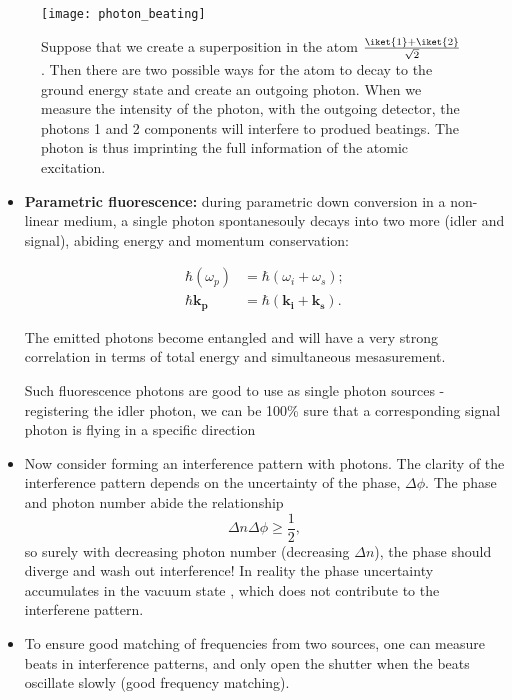 \begin{figure}[h]
  \centering%
  \texttt{[image: photon\_beating]}
  \caption{\small Suppose  that we create  a superposition in  the atom
    $ \frac{\iket{1}+\iket{2}}{\sqrt{2}} $. Then there are two possible
    ways for the atom to decay to the ground energy state and create an
    outgoing photon.  When we measure the intensity of the photon, with
    the  outgoing detector,  the photons  1 and  2 components
    will interfere to  produed beatings. The photon  is thus imprinting
    the  full information  of the  atomic excitation.   }
\end{figure}

\noindent

\begin{itemize}
\item   \textbf{Parametric   fluorescence:}  during   parametric   down
  conversion  in a  non-linear  medium, a  single photon  spontanesouly
  decays into two more (idler  and signal), abiding energy and momentum
  conservation:

  \begin{equation}
    \begin{aligned}
      \hbar(\omega_p) & = \hbar(\omega_i + \omega_s);\\
      \hbar\mathbf{k_p} & = \hbar(\mathbf{k_i} + \mathbf{k_s}).
    \end{aligned}
  \end{equation}

  \noindent The emitted  photons become entangled and will  have a very
  strong  correlation  in  terms   of  total  energy  and  simultaneous
  mesasurement.

  Such fluorescence photons are good to  use as single photon sources -
  registering  the  idler   photon,  we  can  be  100\%   sure  that  a
  corresponding signal photon is flying in a specific direction
\item Now  consider forming an  interference pattern with  photons. The
  clarity of the interference pattern depends on the uncertainty of the
  phase,  $  \Delta\phi $.   The  phase  and  photon number  abide  the
  relationship
  \begin{equation}
    \Delta n\Delta\phi \ge\frac{1}{2},
  \end{equation}
  \noindent  so  surely  with   decreasing  photon  number  (decreasing
  $ \Delta n $), the phase should diverge and wash out interference! \iRa In
  reality  the  phase  uncertainty  accumulates  in  the  vacuum  state
  , which does not contribute to the interferene pattern.
\item To ensure good matching of  frequencies from two sources, one can
  measure beats  in interference  patterns, and  only open  the shutter
  when the beats oscillate slowly (good frequency matching).
\end{itemize}


